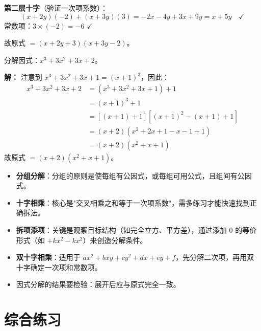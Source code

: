 \documentclass[12pt, a4paper]{ctexart}
\begin{document}
\textbf{第二层十字}（验证一次项系数）：
\[
(x+2y)(-2) + (x+3y)(3) = -2x - 4y + 3x + 9y = x + 5y \quad \checkmark
\]
常数项：$3 \times (-2) = -6$ $\checkmark$

故原式 $= \boxed{(x+2y+3)(x+3y-2)}$。

\begin{examplebox}[【例20】拆项添项法进阶]
分解因式：$x^3 + 3x^2 + 3x + 2$。
\end{examplebox}

\textbf{解：} 注意到 $x^3+3x^2+3x+1 = (x+1)^3$，因此：
\begin{align*}
x^3 + 3x^2 + 3x + 2 &= (x^3+3x^2+3x+1) + 1 \\
&= (x+1)^3 + 1 \\
&= [(x+1)+1][(x+1)^2 - (x+1) + 1] \\
&= (x+2)(x^2+2x+1-x-1+1) \\
&= (x+2)(x^2+x+1)
\end{align*}
故原式 $= \boxed{(x+2)(x^2+x+1)}$。

\begin{tipbox}[因式分解高级技巧要点]
\begin{itemize}[leftmargin=1.5em]
  \item \textbf{分组分解}：分组的原则是使每组有公因式，或每组可用公式，且组间有公因式。
  \item \textbf{十字相乘}：核心是"交叉相乘之和等于一次项系数"，需多练习才能快速找到正确拆法。
  \item \textbf{拆项添项}：关键是观察目标结构（如完全立方、平方差），通过添加 $0$ 的等价形式（如 $+kx^2 - kx^2$）来创造分解条件。
  \item \textbf{双十字相乘}：适用于 $ax^2+bxy+cy^2+dx+ey+f$，先分解二次项，再用双十字确定一次项和常数项。
  \item 因式分解的结果要检验：展开后应与原式完全一致。
\end{itemize}
\end{tipbox}

\newpage
\section*{\textcolor{mainblue}{综合练习}}
\end{document}
